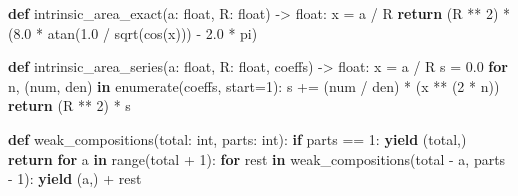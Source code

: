 \documentclass[
  12pt,
  a4paper,
]{article}
\newenvironment{Shaded}{}{}
\newcommand{\BuiltInTok}[1]{\textcolor[rgb]{0.00,0.50,0.00}{#1}}
\newcommand{\ControlFlowTok}[1]{\textcolor[rgb]{0.00,0.44,0.13}{\textbf{#1}}}
\newcommand{\DecValTok}[1]{\textcolor[rgb]{0.25,0.63,0.44}{#1}}
\newcommand{\FloatTok}[1]{\textcolor[rgb]{0.25,0.63,0.44}{#1}}
\newcommand{\KeywordTok}[1]{\textcolor[rgb]{0.00,0.44,0.13}{\textbf{#1}}}
\newcommand{\NormalTok}[1]{#1}
\newcommand{\OperatorTok}[1]{\textcolor[rgb]{0.40,0.40,0.40}{#1}}
\begin{document}
\begin{Shaded}
\begin{Highlighting}[]
\KeywordTok{def}\NormalTok{ intrinsic\_area\_exact(a: }\BuiltInTok{float}\NormalTok{, R: }\BuiltInTok{float}\NormalTok{) }\OperatorTok{{-}\textgreater{}} \BuiltInTok{float}\NormalTok{:}
\NormalTok{    x }\OperatorTok{=}\NormalTok{ a }\OperatorTok{/}\NormalTok{ R}
    \ControlFlowTok{return}\NormalTok{ (R }\OperatorTok{**} \DecValTok{2}\NormalTok{) }\OperatorTok{*}\NormalTok{ (}\FloatTok{8.0} \OperatorTok{*}\NormalTok{ atan(}\FloatTok{1.0} \OperatorTok{/}\NormalTok{ sqrt(cos(x))) }\OperatorTok{{-}} \FloatTok{2.0} \OperatorTok{*}\NormalTok{ pi)}


\KeywordTok{def}\NormalTok{ intrinsic\_area\_series(a: }\BuiltInTok{float}\NormalTok{, R: }\BuiltInTok{float}\NormalTok{, coeffs) }\OperatorTok{{-}\textgreater{}} \BuiltInTok{float}\NormalTok{:}
\NormalTok{    x }\OperatorTok{=}\NormalTok{ a }\OperatorTok{/}\NormalTok{ R}
\NormalTok{    s }\OperatorTok{=} \FloatTok{0.0}
    \ControlFlowTok{for}\NormalTok{ n, (num, den) }\KeywordTok{in} \BuiltInTok{enumerate}\NormalTok{(coeffs, start}\OperatorTok{=}\DecValTok{1}\NormalTok{):}
\NormalTok{        s }\OperatorTok{+=}\NormalTok{ (num }\OperatorTok{/}\NormalTok{ den) }\OperatorTok{*}\NormalTok{ (x }\OperatorTok{**}\NormalTok{ (}\DecValTok{2} \OperatorTok{*}\NormalTok{ n))}
    \ControlFlowTok{return}\NormalTok{ (R }\OperatorTok{**} \DecValTok{2}\NormalTok{) }\OperatorTok{*}\NormalTok{ s}


\KeywordTok{def}\NormalTok{ weak\_compositions(total: }\BuiltInTok{int}\NormalTok{, parts: }\BuiltInTok{int}\NormalTok{):}
    \ControlFlowTok{if}\NormalTok{ parts }\OperatorTok{==} \DecValTok{1}\NormalTok{:}
        \ControlFlowTok{yield}\NormalTok{ (total,)}
        \ControlFlowTok{return}
    \ControlFlowTok{for}\NormalTok{ a }\KeywordTok{in} \BuiltInTok{range}\NormalTok{(total }\OperatorTok{+} \DecValTok{1}\NormalTok{):}
        \ControlFlowTok{for}\NormalTok{ rest }\KeywordTok{in}\NormalTok{ weak\_compositions(total }\OperatorTok{{-}}\NormalTok{ a, parts }\OperatorTok{{-}} \DecValTok{1}\NormalTok{):}
            \ControlFlowTok{yield}\NormalTok{ (a,) }\OperatorTok{+}\NormalTok{ rest}



\end{Highlighting}
\end{Shaded}
\end{document}
